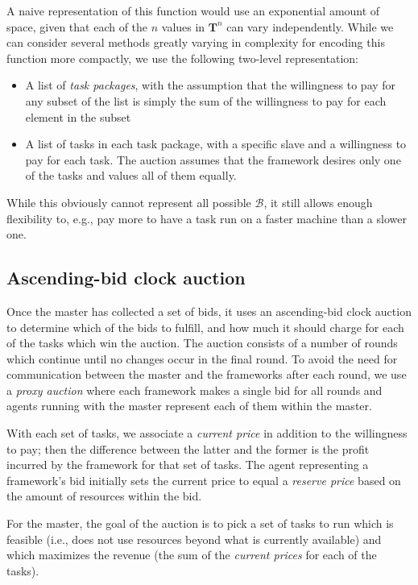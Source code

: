 \documentclass{acm_proc_article-sp}
\begin{document}
A naive representation of this function would use an exponential amount of
space, given that each of the $n$ values in $\mathbf{T}^n$ can vary
independently. While we can consider several methods greatly varying in
complexity for encoding this function more compactly, we use the following
two-level representation:
\begin{itemize}
  \item A list of \emph{task packages}, with the assumption that the willingness
    to pay for any subset of the list is simply the sum of the willingness to
    pay for each element in the subset
  \item A list of tasks in each task package, with a specific slave and a
    willingness to pay for each task. The auction assumes that the framework
    desires only one of the tasks and values all of them equally.
\end{itemize}
While this obviously cannot represent all possible $\mathcal{B}$, it still
allows enough flexibility to, e.g., pay more to have a task run on a faster
machine than a slower one.

\subsection{Ascending-bid clock auction}
Once the master has collected a set of bids, it uses an ascending-bid clock
auction to determine which of the bids to fulfill, and how much it should charge
for each of the tasks which win the auction. The auction consists of a number of
rounds which continue until no changes occur in the final round. To avoid the
need for communication between the master and the frameworks after each round,
we use a \emph{proxy auction} where each framework makes a single bid for all
rounds and agents running with the master represent each of them within the
master.

With each set of tasks, we associate a \emph{current price} in addition to the
willingness to pay; then the difference between the latter and the former is the
profit incurred by the framework for that set of tasks. The agent representing a
framework's bid initially sets the current price to equal a \emph{reserve price}
based on the amount of resources within the bid.

For the master, the goal of the auction is to pick a set of tasks to run which
is feasible (i.e., does not use resources beyond what is currently available) and
which maximizes the revenue (the sum of the \emph{current prices} for each of the
tasks).
\end{document}
